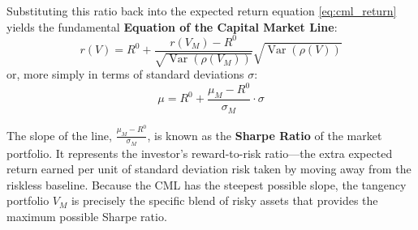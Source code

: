 Substituting this ratio back into the expected return equation \eqref{eq:cml_return} yields the fundamental \textbf{Equation of the Capital Market Line}:
\begin{equation}
    r(V) = R^0 + \frac{r(V_M) - R^0}{\sqrt{\operatorname{Var}(\rho(V_M))}} \sqrt{\operatorname{Var}(\rho(V))}
\end{equation}
or, more simply in terms of standard deviations $\sigma$:
\begin{equation}
    \mu = R^0 + \frac{\mu_M - R^0}{\sigma_M} \cdot \sigma
\end{equation}

The slope of the line, $\frac{\mu_M - R^0}{\sigma_M}$, is known as the \textbf{Sharpe Ratio} of the market portfolio. It represents the investor's reward-to-risk ratio—the extra expected return earned per unit of standard deviation risk taken by moving away from the riskless baseline. Because the CML has the steepest possible slope, the tangency portfolio $V_M$ is precisely the specific blend of risky assets that provides the maximum possible Sharpe ratio.
